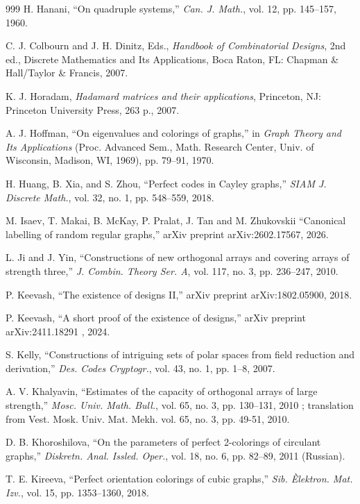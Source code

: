 \documentclass[11pt]{article}
\theoremstyle{definition}
\begin{document}
{{{\begin{thebibliography}{999}
H. Hanani,
``On quadruple systems,''
\textit{Can. J. Math.}, vol. 12, pp. 145--157, 1960.

C. J. Colbourn and J. H. Dinitz, Eds.,
\textit{Handbook of Combinatorial Designs}, 2nd ed.,
Discrete Mathematics and Its Applications,
Boca Raton, FL: Chapman \& Hall/Taylor \& Francis, 2007.

K. J. Horadam,
\textit{Hadamard matrices and their applications}, 
Princeton, NJ: Princeton University Press, 263 p., 2007.


A. J. Hoffman,
``On eigenvalues and colorings of graphs,''
in \textit{Graph Theory and Its Applications}
(Proc. Advanced Sem., Math. Research Center, Univ. of Wisconsin, Madison, WI, 1969),
pp. 79--91, 1970.

H. Huang, B. Xia, and S. Zhou,
``Perfect codes in Cayley graphs,''
\textit{SIAM J. Discrete Math.}, vol. 32, no. 1, pp. 548--559, 2018.

M. Isaev, T. Makai,  B. McKay,  P. Pralat, J. Tan and M. Zhukovskii
``Canonical labelling of random regular graphs,''
arXiv preprint arXiv:2602.17567,  2026.
     

L. Ji and J. Yin,
``Constructions of new orthogonal arrays and covering arrays of strength three,''
\textit{J. Combin. Theory Ser. A}, vol. 117, no. 3, pp. 236--247, 2010.


P. Keevash,
``The existence of designs II,''
arXiv preprint arXiv:1802.05900, 2018.

P. Keevash,
``A short proof of the existence of designs,''
arXiv preprint arXiv:2411.18291 , 2024.


S. Kelly,
``Constructions of intriguing sets of polar spaces from field reduction and derivation,''
\textit{Des. Codes Cryptogr.}, vol. 43, no. 1, pp. 1--8, 2007.

A. V. Khalyavin,
``Estimates of the capacity of orthogonal arrays of large strength,''
\textit{Mosc. Univ. Math. Bull.}, vol. 65, no. 3, pp. 130--131, 2010 ; translation from Vest. Mosk. Univ. Mat. Mekh. vol. 65, no. 3, pp. 49-51, 2010.

D. B. Khoroshilova,
``On the parameters of perfect 2-colorings of circulant graphs,''
\textit{Diskretn. Anal. Issled. Oper.}, vol. 18, no. 6, pp. 82--89, 2011 (Russian).

T. E. Kireeva,
``Perfect orientation colorings of cubic graphs,''
\textit{Sib. Èlektron. Mat. Izv.}, vol. 15, pp. 1353--1360, 2018.


\end{thebibliography}}}}
\end{document}
